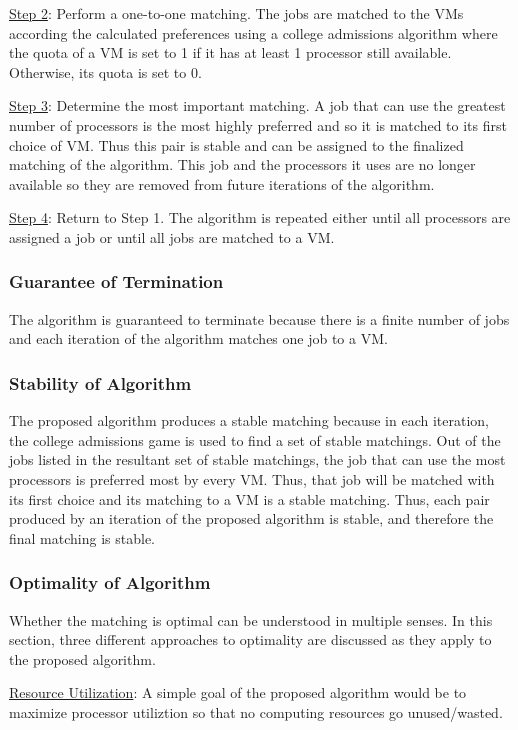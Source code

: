 \documentclass[conference]{IEEEtran}
\begin{document}
\underline{Step 2}: Perform a one-to-one matching.
The jobs are matched to the VMs according the calculated preferences
using a college admissions algorithm where the quota of a VM is 
set to 1 if it has at least 1 processor still available. 
Otherwise, its quota is set to 0.

\underline{Step 3}: Determine the most important matching.
A job that can use the greatest number of processors is the
most highly preferred and so it is matched to its first choice
of VM. Thus this pair is stable and can be assigned to 
the finalized matching of the algorithm. 
This job and the processors it uses are no longer available
so they are removed from future iterations of the algorithm.

\underline{Step 4}: Return to Step 1.
The algorithm is repeated either until all processors are 
assigned a job or until all jobs are matched 
to a VM.

\subsubsection{Guarantee of Termination}
The algorithm is guaranteed to terminate because there is a 
finite number of jobs and each iteration of the algorithm
matches one job to a VM.

\subsubsection{Stability of Algorithm}
The proposed algorithm produces a stable matching because in
each iteration, the college admissions game is used to find
a set of stable matchings.
Out of the jobs listed in the resultant set of stable matchings,
the job that can use the most processors is preferred most
by every VM. Thus, that job will be matched with its first 
choice and its matching to a VM is a stable matching.
Thus, each pair produced by an iteration of the proposed
algorithm is stable, and therefore the final matching is stable.

\subsubsection{Optimality of Algorithm}
Whether the matching is optimal can be understood in multiple senses.
In this section, three different approaches to optimality are 
discussed as they apply to the proposed algorithm.

\underline{Resource Utilization}:
A simple goal of the proposed algorithm would be to 
maximize processor utiliztion so that no computing 
resources go unused/wasted.
\end{document}
